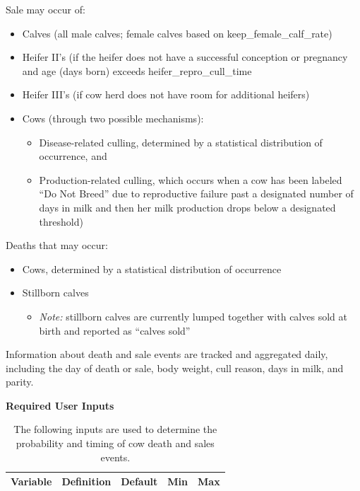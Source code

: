 \documentclass{article}
\begin{document}
\begin{refsection}
Sale may occur of: 
\begin{itemize}
    \item Calves (all male calves; female calves based on keep\_female\_calf\_rate)
    \item Heifer II’s (if the heifer does not have a successful conception or pregnancy and age (days born) exceeds heifer\_repro\_cull\_time
    \item Heifer III’s (if cow herd does not have room for additional heifers)
    \item Cows (through two possible mechanisms): 
    \begin{itemize}
        \item Disease-related culling, determined by a statistical distribution of occurrence, and
        \item Production-related culling, which occurs when a cow has been labeled “Do Not Breed” due to reproductive failure past a designated number of days in milk and then her milk production drops below a designated threshold)
    \end{itemize}
\end{itemize}
Deaths that may occur: 
\begin{itemize}
    \item Cows, determined by a statistical distribution of occurrence 
    \item Stillborn calves 
    \begin{itemize}
        \item \textit{Note:} stillborn calves are currently lumped together with calves sold at birth and reported as “calves sold” 
    \end{itemize}
\end{itemize}
Information about death and sale events are tracked and aggregated daily, including the day of death or sale, body weight, cull reason, days in milk, and parity. 
    

\textbf{Required User Inputs} 
\vspace{-0.25cm}


\begin{landscape}
\thispagestyle{empty} %

\renewcommand{\arraystretch}{1.4} %
\begin{longtable}{@{} L{4cm} L{8cm} C{2cm} C{2cm} C{2cm} @{}}
\caption{The following inputs are used to determine the probability and timing of cow death and sales events.} \\
\toprule
\textbf{Variable} & \textbf{Definition} & \textbf{Default} & \textbf{Min} & \textbf{Max} \\
\midrule
\endfirsthead


\end{longtable}
\end{landscape}
\end{refsection}
\end{document}
